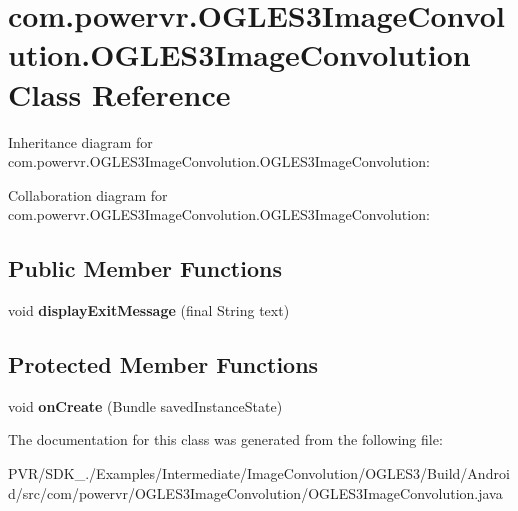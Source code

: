 \hypertarget{classcom_1_1powervr_1_1_o_g_l_e_s3_image_convolution_1_1_o_g_l_e_s3_image_convolution}{\section{com.\+powervr.\+O\+G\+L\+E\+S3\+Image\+Convolution.\+O\+G\+L\+E\+S3\+Image\+Convolution Class Reference}
\label{classcom_1_1powervr_1_1_o_g_l_e_s3_image_convolution_1_1_o_g_l_e_s3_image_convolution}
}


Inheritance diagram for com.\+powervr.\+O\+G\+L\+E\+S3\+Image\+Convolution.\+O\+G\+L\+E\+S3\+Image\+Convolution\+:


Collaboration diagram for com.\+powervr.\+O\+G\+L\+E\+S3\+Image\+Convolution.\+O\+G\+L\+E\+S3\+Image\+Convolution\+:
\subsection*{Public Member Functions}
\begin{DoxyCompactItemize}
\item 
\hypertarget{classcom_1_1powervr_1_1_o_g_l_e_s3_image_convolution_1_1_o_g_l_e_s3_image_convolution_a11ecbd3e0ab092e0723b4d563232ae08}{void {\bfseries display\+Exit\+Message} (final String text)}\label{classcom_1_1powervr_1_1_o_g_l_e_s3_image_convolution_1_1_o_g_l_e_s3_image_convolution_a11ecbd3e0ab092e0723b4d563232ae08}

\end{DoxyCompactItemize}
\subsection*{Protected Member Functions}
\begin{DoxyCompactItemize}
\item 
\hypertarget{classcom_1_1powervr_1_1_o_g_l_e_s3_image_convolution_1_1_o_g_l_e_s3_image_convolution_a032bc8701696a027a2fbf8a55e8f4e97}{void {\bfseries on\+Create} (Bundle saved\+Instance\+State)}\label{classcom_1_1powervr_1_1_o_g_l_e_s3_image_convolution_1_1_o_g_l_e_s3_image_convolution_a032bc8701696a027a2fbf8a55e8f4e97}

\end{DoxyCompactItemize}


The documentation for this class was generated from the following file\+:\begin{DoxyCompactItemize}
\item 
P\+V\+R/\+S\+D\+K\+\_./\+Examples/\+Intermediate/\+Image\+Convolution/\+O\+G\+L\+E\+S3/\+Build/\+Android/src/com/powervr/\+O\+G\+L\+E\+S3\+Image\+Convolution/O\+G\+L\+E\+S3\+Image\+Convolution.\+java\end{DoxyCompactItemize}
